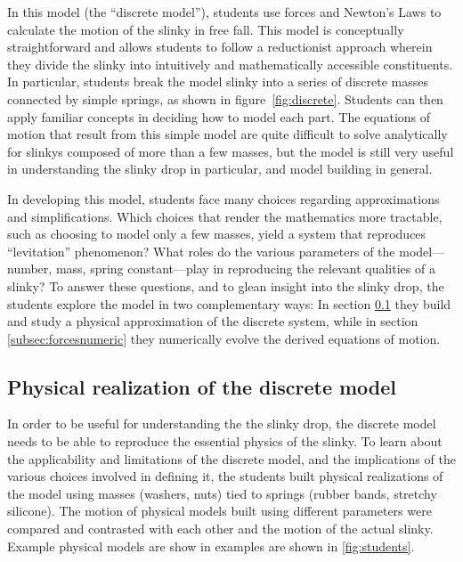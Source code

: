 \documentclass[prb,preprint,superscriptaddress]{revtex4-1}
\newcommand{\subsec}[1]{section~\ref{subsec:#1}}
\newcommand{\fig}[1]{figure~\ref{fig:#1}}
\begin{document}
In this model (the ``discrete model''), students use forces and Newton's Laws to calculate the
motion of the slinky in free fall. This
model is conceptually straightforward and allows students to follow a
reductionist approach wherein they divide the slinky into intuitively and mathematically accessible
constituents. In particular, students break the model slinky into a series of discrete masses connected by simple springs,
as shown in \fig{discrete}.
Students can then apply familiar concepts in deciding how to model each part. The equations of motion that result from this simple model are quite difficult to solve analytically for slinkys composed of more than a few masses, but the model is still very useful in understanding the slinky drop in particular, and model building in general. 

In developing this model, students face many choices regarding approximations and simplifications. Which choices that render the mathematics more tractable, such as choosing to model only a few masses, yield a system that reproduces ``levitation'' phenomenon? What roles do the various parameters of the model---number, mass, spring constant---play in reproducing the relevant qualities of a slinky? To answer these questions, and to glean insight into the slinky drop, the students explore the model in two complementary ways: In section \ref{subsec:forcesexperiment} they build and study a physical approximation of the discrete system, while in section \ref{subsec:forcesnumeric} they numerically evolve the derived equations of motion.




\subsection{Physical realization of the discrete model}
\label{subsec:forcesexperiment}

In order to be useful for understanding the the slinky drop, the discrete model needs to be able to reproduce the essential physics of the slinky. To learn about the applicability and limitations of the discrete model, and the implications of the various choices involved in defining it, the students built physical realizations of the model using masses (washers, nuts) tied to springs (rubber bands, stretchy silicone).  The motion of physical models built using different parameters were compared and contrasted with each other and the motion of the actual slinky.  Example physical models are show in examples are shown in \ref{fig:students}.  
\end{document}
